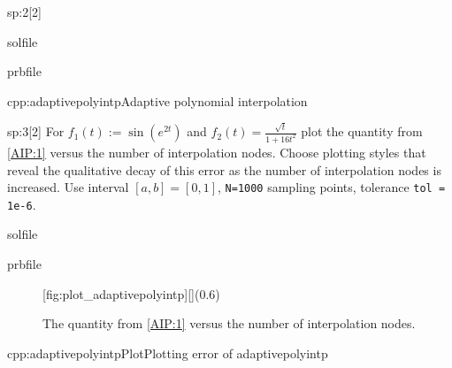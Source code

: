\begin{samproblem}
\begin{subproblem}{sp:2}[2]
  \begin{samwriteprbpart}{solfile}
    \begin{writeverbatim}{prbfile}
      \begin{samsolution}
        \begin{samcode}[C++-code]{cpp:adaptivepolyintp}{Adaptive polynomial interpolation}
          \small
          
        \end{samcode}
     \end{samsolution}
    \end{writeverbatim}
  \end{samwriteprbpart}

\end{subproblem}



\begin{subproblem}{sp:3}[2]
  For $f_{1}(t) := \sin(e^{2t})$ and $f_{2}(t) = \frac{\sqrt{t}}{1+16t^{2}}$ plot the quantity from
  \eqref{AIP:1} versus the number of interpolation nodes. Choose plotting styles
  that reveal the qualitative decay of this error as the number of interpolation
  nodes is increased. Use interval $[a,b] = [0,1]$, \texttt{N=1000} sampling points,
  tolerance \texttt{tol = 1e-6}.

  \begin{samwriteprbpart}{solfile}
    \begin{writeverbatim}{prbfile}
      \begin{samsolution}
        \begin{figure}[h]
          \centering
          [fig:plot_adaptivepolyintp][](0.6\textwidth)
          \caption{The quantity from \eqref{AIP:1} versus the number of interpolation nodes.}
        \end{figure}
        \begin{samcode}[C++-code]{cpp:adaptivepolyintpPlot}{Plotting error of adaptivepolyintp}
          
        \end{samcode}
     \end{samsolution}
    \end{writeverbatim}
  \end{samwriteprbpart}

\end{subproblem}

\end{samproblem}
